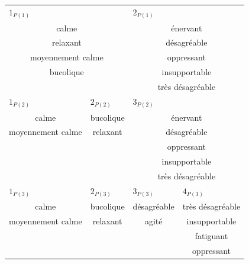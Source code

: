 \begin{table}[t]
\centering
\tiny
\begin{tabular}{c|c|c|c|c|c|c}
\multicolumn{3}{l|}{$1_{P(1)}$}   & \multicolumn{4}{l}{$2_{P(1)}$} \\
\multicolumn{3}{c|}{calme}        & \multicolumn{4}{c}{énervant} \\
\multicolumn{3}{c|}{relaxant}     & \multicolumn{4}{c}{désagréable} \\
\multicolumn{3}{c|}{moyennement calme} & \multicolumn{4}{c}{oppressant} \\
\multicolumn{3}{c|}{bucolique}      & \multicolumn{4}{c}{insupportable} \\
\multicolumn{3}{c|}{}             & \multicolumn{4}{c}{très désagréable} \\                                            
\hline
\multicolumn{2}{l|}{$1_{P(2)}$}   & \multicolumn{1}{l|}{$2_{P(2)}$} & \multicolumn{4}{l}{$3_{P(2)}$} \\
\multicolumn{2}{c|}{calme}        & bucolique   & \multicolumn{4}{c}{énervant} \\
\multicolumn{2}{c|}{moyennement calme} & relaxant  & \multicolumn{4}{c}{désagréable} \\
\multicolumn{2}{c|}{}             &           & \multicolumn{4}{c}{oppressant} \\
\multicolumn{2}{c|}{}             &           & \multicolumn{4}{c}{insupportable} \\	
\multicolumn{2}{c|}{}             &           & \multicolumn{4}{c}{très désagréable} \\	
\hline
\multicolumn{2}{l|}{$1_{P(3)}$} & \multicolumn{1}{l|}{$2_{P(3)}$} & \multicolumn{3}{l|}{$3_{P(3)}$} & \multicolumn{1}{l}{$4_{P(3)}$} \\ 
\multicolumn{2}{c|}{calme}        & bucolique  & \multicolumn{3}{c|}{désagréable} & très désagréable \\         
\multicolumn{2}{c|}{moyennement calme} & relaxant & \multicolumn{3}{c|}{agité}   & insupportable\\ 
\multicolumn{2}{c|}{}            &          & \multicolumn{3}{c|}{}           & fatiguant \\ 
\multicolumn{2}{c|}{}            &          & \multicolumn{3}{c|}{}           & oppressant \\ 
                

\end{tabular}
\end{table}
